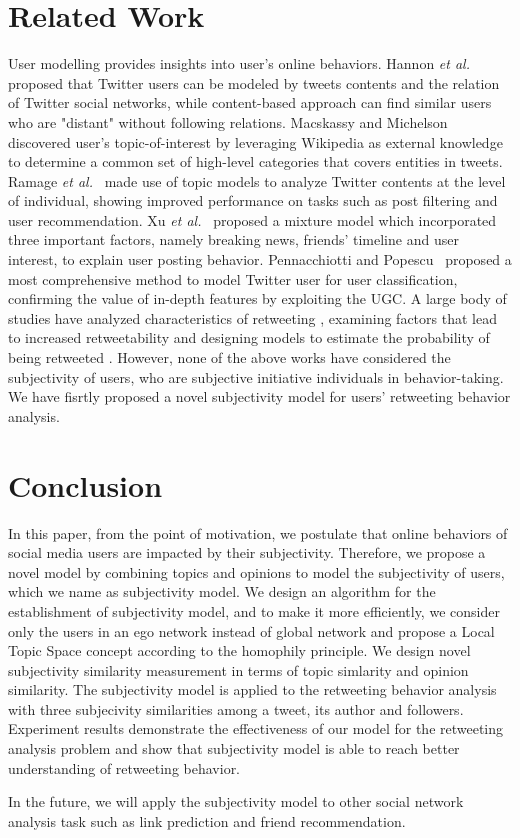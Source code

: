 \documentclass[letterpaper]{article}
\begin{document}
\section{Related Work}
\label{relatedwork}
   
User modelling provides insights into user's online behaviors. 
Hannon \emph{et al.}~ proposed that Twitter users can be modeled by tweets contents and the relation of Twitter social networks, while content-based approach can find similar users who are "distant" without following relations. 
Macskassy and Michelson~ discovered user's topic-of-interest by leveraging Wikipedia as external knowledge to determine a common set of high-level categories that covers entities in tweets. 
Ramage \emph{et al.}~ made use of topic models to analyze Twitter contents at the level of individual, showing improved performance on tasks such as post filtering and user recommendation. 
Xu \emph{et al.}~ proposed a mixture model which incorporated three important factors, namely breaking news, friends' timeline and user interest, to explain user posting behavior.
Pennacchiotti and Popescu~ proposed a most comprehensive method to model Twitter user for user classification, confirming the value of in-depth features by exploiting the UGC.
A large body of studies have analyzed characteristics of retweeting \cite{macskassy2011people,Luo:2013RMF}, examining factors that lead to increased retweetability \cite{suh2010want,comarela2012understanding} and designing models to estimate the probability of being retweeted \cite{petrovic2011rt,jenders2013analyzing,pfitzner2012emotional}. However, none of the above works have considered the subjectivity of users, who are subjective initiative individuals in behavior-taking. We have fisrtly proposed a novel subjectivity model for users' retweeting behavior analysis. 

\section{Conclusion}
In this paper, from the point of motivation, we postulate that online behaviors of social media users are impacted by their subjectivity. Therefore, we propose a novel model by combining topics and opinions to model the subjectivity of users, which we name as subjectivity model. We design an algorithm for the establishment of subjectivity model, and to make it more efficiently, we consider only the users in an ego network instead of global network and propose a Local Topic Space concept according to the homophily principle. We design novel subjectivity similarity measurement in terms of topic simlarity and opinion similarity. The subjectivity model is applied to the retweeting behavior analysis with three subjecivity similarities among a tweet, its author and followers. 
Experiment results demonstrate the effectiveness of our model for the retweeting analysis problem and show that subjectivity model is able to reach better understanding of retweeting behavior. 

In the future, we will apply the subjectivity model to other social network analysis task such as link prediction and friend recommendation. 



\end{document}
